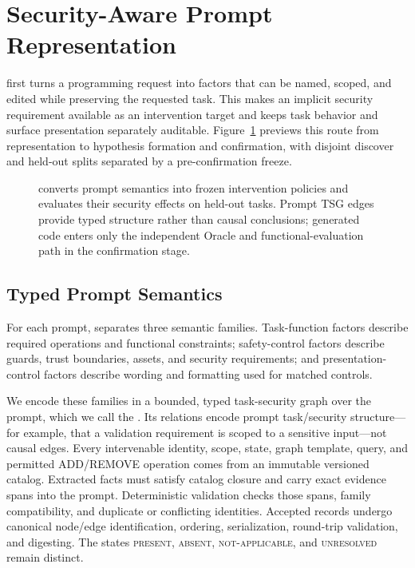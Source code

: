 \section{Security-Aware Prompt Representation}

\model first turns a programming request into factors that can be named,
scoped, and edited while preserving the requested task. This makes an implicit
security requirement available as an intervention target and keeps task
behavior and surface presentation separately auditable.
Figure~\ref{fig:overview} previews this route from representation to hypothesis
formation and confirmation, with disjoint discover and held-out splits
separated by a pre-confirmation freeze.

\begin{figure}[t]
  \centering
  \resizebox{\linewidth}{!}{%
    
  }
  \caption{\model converts prompt semantics into frozen intervention policies
  and evaluates their security effects on held-out tasks. Prompt TSG edges provide
  typed structure rather than causal conclusions; generated code enters only
  the independent Oracle and functional-evaluation path in the confirmation
  stage.}
  \label{fig:overview}
\end{figure}

\subsection{Typed Prompt Semantics}

For each prompt, \model separates three semantic families. Task-function
factors describe required operations and functional constraints; safety-control
factors describe guards, trust boundaries, assets, and security requirements;
and presentation-control factors describe wording and formatting used for
matched controls.

We encode these families in a bounded, typed task-security graph over the
prompt, which we call the \prompttsg.
Its relations encode prompt task/security structure---for example, that a
validation requirement is scoped to a sensitive input---not causal edges.
Every intervenable identity, scope, state, graph template, query, and permitted
ADD/REMOVE operation comes from an immutable versioned catalog. Extracted facts
must satisfy catalog closure and carry exact evidence spans into the prompt.
Deterministic validation checks those spans, family compatibility, and
duplicate or conflicting identities. Accepted records undergo canonical
node/edge identification, ordering, serialization, round-trip validation, and
digesting. The states \textsc{present}, \textsc{absent},
\textsc{not-applicable}, and \textsc{unresolved} remain distinct.

